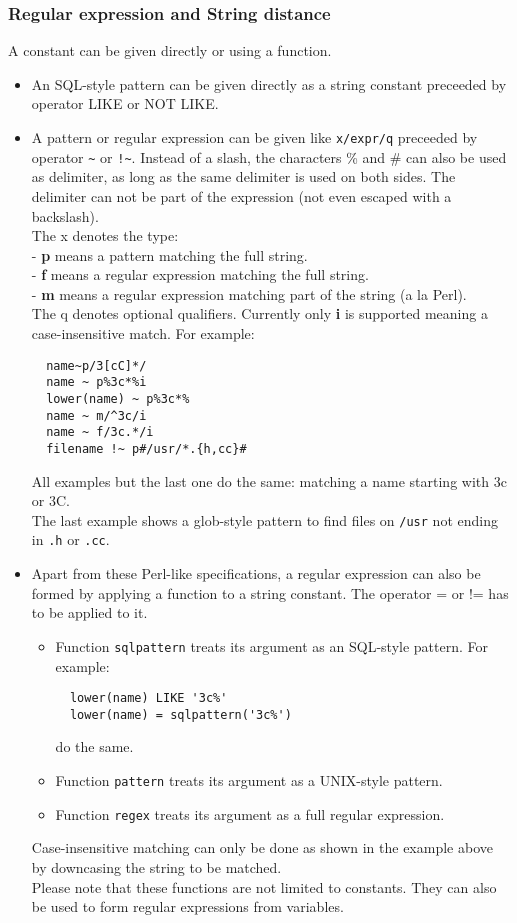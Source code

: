 \subsubsection{\label{TAQL:REGEXCONST}Regular expression and String distance}
A  constant can be given
directly or using a function.
\begin{itemize}
\item An SQL-style pattern can be given directly as a string constant
  preceeded by operator LIKE or NOT LIKE.
\item A pattern or regular expression can be given like
  \texttt{x/expr/q} preceeded by operator \verb+~+ or \verb+!~+.
  Instead of a slash, the characters \% and \# can also be used as
  delimiter, as long as the same delimiter is used on both sides.
  The delimiter can not be part of the expression 
  (not even escaped with a backslash).
  \\The x denotes the type:
  \\- \textbf{p} means a pattern matching the full string.
  \\- \textbf{f} means a regular expression matching the full string.
  \\- \textbf{m} means a regular expression matching part of the string (a la Perl).
  \\The q denotes optional qualifiers. Currently only \textbf{i} is supported
  meaning a case-insensitive match. For example:
\begin{verbatim}
  name~p/3[cC]*/
  name ~ p%3c*%i
  lower(name) ~ p%3c*%
  name ~ m/^3c/i
  name ~ f/3c.*/i
  filename !~ p#/usr/*.{h,cc}#
\end{verbatim}
  All examples but the last one do the same: matching a name starting with
  3c or 3C.
  \\The last example shows a glob-style pattern to find files on
  \texttt{/usr} not ending in \texttt{.h} or \texttt{.cc}.
\item Apart from these Perl-like specifications, a regular expression can
  also be formed by applying a function to a string constant. The operator
  = or != has to be applied to it.
  \begin{itemize}
  \item Function \texttt{sqlpattern} treats its argument as an SQL-style pattern.
    For example:
\begin{verbatim}
  lower(name) LIKE '3c%'
  lower(name) = sqlpattern('3c%')
\end{verbatim}
    do the same.
  \item Function \texttt{pattern} treats its argument as a UNIX-style pattern.
  \item Function \texttt{regex} treats its argument as a full regular expression.
  \end{itemize}
  Case-insensitive matching can only be done as shown in the example
  above by downcasing the string to be matched.
  \\Please note that these functions are not limited to constants. They can
  also be used to form regular expressions from variables.
\end{itemize}

